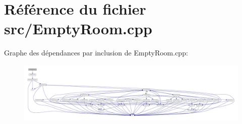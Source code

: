 \section{Référence du fichier src/\-Empty\-Room.cpp}
\label{_empty_room_8cpp}
Graphe des dépendances par inclusion de Empty\-Room.\-cpp\-:\nopagebreak
\begin{figure}[H]
\begin{center}
\leavevmode
\includegraphics[width=350pt]{_empty_room_8cpp__incl}
\end{center}
\end{figure}
